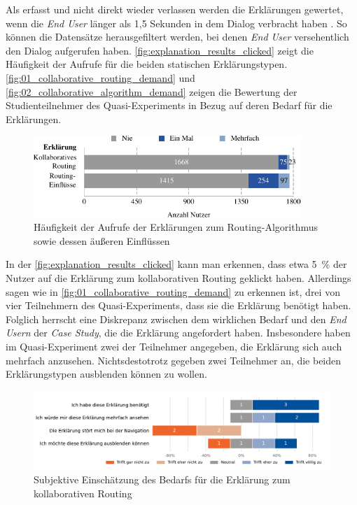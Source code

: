 Als erfasst und nicht direkt wieder verlassen werden die Erklärungen gewertet, wenn die \textit{End User} länger als 1,5 Sekunden in dem Dialog verbracht haben \cite{BAHR2011776}. So können die Datensätze herausgefiltert werden, bei denen \textit{End User} versehentlich den Dialog aufgerufen haben. \autoref{fig:explanation_results_clicked} zeigt die Häufigkeit der Aufrufe für die beiden statischen Erklärungstypen. \autoref{fig:01_collaborative_routing_demand} und \autoref{fig:02_collaborative_algorithm_demand} zeigen die Bewertung der Studienteilnehmer des Quasi-Experiments in Bezug auf deren Bedarf für die Erklärungen.

\begin{figure}[htb!]
    \centering
    \includegraphics[width=0.9\textwidth]{contents/06_model_evaluation/02_evaluation/res/explanation_results_clicked.pdf}
    \caption{Häufigkeit der Aufrufe der Erklärungen zum Routing-Algorithmus sowie dessen äußeren Einflüssen}
    \label{fig:explanation_results_clicked}
\end{figure}

In der \autoref{fig:explanation_results_clicked} kann man erkennen, dass etwa 5~\% der Nutzer auf die Erklärung zum kollaborativen Routing geklickt haben. Allerdings sagen wie in \autoref{fig:01_collaborative_routing_demand} zu erkennen ist, drei von vier Teilnehmern des Quasi-Experiments, dass sie die Erklärung benötigt haben. Folglich herrscht eine Diskrepanz zwischen dem wirklichen Bedarf und den \textit{End Usern} der \textit{Case Study}, die die Erklärung angefordert haben. Insbesondere haben im Quasi-Experiment zwei der Teilnehmer angegeben, die Erklärung sich auch mehrfach anzusehen. Nichtsdestotrotz gegeben zwei Teilnehmer an, die beiden Erklärungstypen ausblenden können zu wollen.

\begin{figure}[htb!]
    \centering
    \includegraphics[width=\textwidth]{contents/06_model_evaluation/02_evaluation/res/qualitativeFeedback-01_collaborative_routing_demand.pdf}
    \caption{Subjektive Einschätzung des Bedarfs für die Erklärung zum kollaborativen Routing}
    \label{fig:01_collaborative_routing_demand}
\end{figure}

